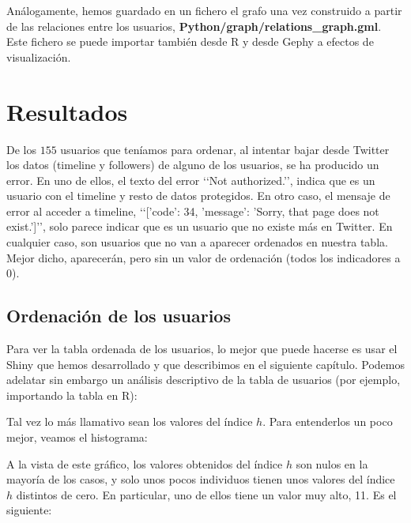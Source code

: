 Análogamente, hemos guardado en un fichero el grafo una vez construido
a partir de las relaciones entre los usuarios, {\bf Python/graph/relations\_graph.gml}.
Este fichero se puede importar también desde R y desde Gephy a efectos de visualización.

\section{Resultados}
De los $155$ usuarios que teníamos para ordenar, al intentar bajar desde Twitter los 
datos (timeline y followers) de alguno de los usuarios, se ha producido un error.
En uno de ellos, el texto del error \lq\lq Not authorized.\rq\rq, indica que
es un usuario con el timeline y resto de datos protegidos.
En otro caso, el mensaje de error al acceder a timeline,
\lq\lq [{'code': 34, 'message': 'Sorry, that page does not exist.'}]\rq\rq,
solo parece indicar que es un usuario
que no existe más en Twitter. En cualquier caso, son usuarios que no van a aparecer 
ordenados en nuestra tabla. Mejor dicho, aparecerán, pero sin un valor de ordenación (todos
los indicadores a $0$).

\subsection{Ordenación de los usuarios}
Para ver la tabla ordenada de los usuarios, lo mejor que puede hacerse es
usar el Shiny que hemos desarrollado y que describimos en el siguiente capítulo.
Podemos adelatar sin embargo un análisis descriptivo de la tabla de usuarios
(por ejemplo, importando la tabla en R):
 

Tal vez lo más llamativo sean los valores del índice $h$. Para entenderlos un
poco mejor, veamos el histograma:


A la vista de este gráfico, los valores obtenidos del índice $h$ son nulos en
la mayoría de los casos, y solo unos pocos individuos tienen unos valores 
del índice $h$ distintos de cero. En particular, uno de ellos tiene un valor muy alto, 11.
Es el siguiente:


